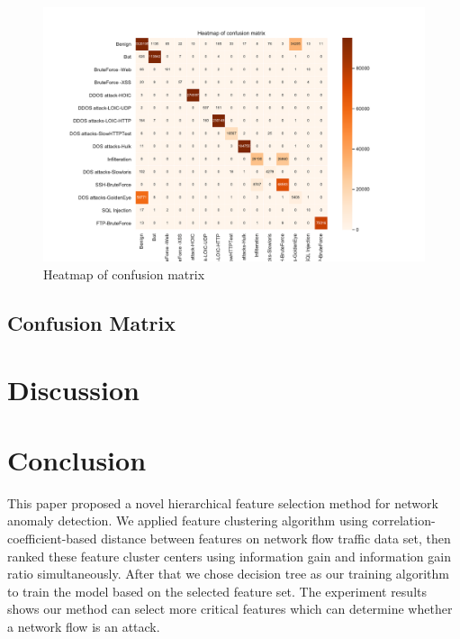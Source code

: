 \documentclass[journal]{IEEEtran}
\begin{document}
\begin{figure}[!htbp]
    \centering
    \includegraphics[scale=0.5]{fig/confusion-matrix.pdf}
    \caption{Heatmap of confusion matrix}
    \label{fig:confusion-matrix}
\end{figure}

\subsection{Confusion Matrix}

\section{Discussion}
\label{sec:discussion}

\section{Conclusion}
\label{sec:conclusion}

This paper proposed a novel hierarchical feature selection method for network anomaly detection. We applied feature clustering algorithm using correlation-coefficient-based distance between features on network flow traffic data set, then ranked these feature cluster centers using information gain and information gain ratio simultaneously. After that we chose decision tree as our training algorithm to train the model based on the selected feature set. The experiment results shows our method can select more critical features which can determine whether a network flow is an attack. 
\end{document}
